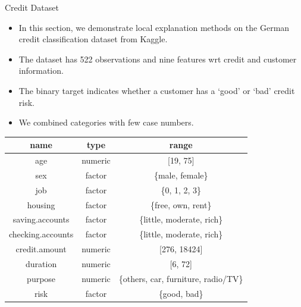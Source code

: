 \documentclass[aspectratio=169]{../latex_main/tntbeamer}  %
\begin{document}
\begin{frame}{Credit Dataset}
    \vspace{-2em}
	\begin{itemize}
		\item In this section, we demonstrate local explanation methods on the German credit classification dataset from Kaggle. \href{https://www.kaggle.com/uciml/german-credit}{}
		\item The dataset has 522 observations and nine features wrt credit and customer information.
		\item The binary target indicates whether a customer has a `good' or `bad' credit risk.  
		\item We combined categories with few case numbers. 
	\end{itemize}
		\begin{center}
			\footnotesize
			\begin{tabular}{ccc}
				\toprule
				name & type & range\\
				\midrule
				age & numeric & [19, 75]\\
				sex & factor & \{male, female\}\\
				job & factor & \{0, 1, 2, 3\}\\
				housing & factor & \{free, own, rent\}\\
				saving.accounts & factor & \{little, moderate, rich\}\\
				checking.accounts & factor & \{little, moderate, rich\}\\
				credit.amount & numeric & [276, 18424]\\
				duration & numeric &  [6, 72]\\
				purpose & numeric &  \{others, car, furniture, radio/TV\}\\
				risk & factor & \{good, bad\}
				\bottomrule
			\end{tabular}
		\end{center}
\end{frame}
\end{document}
